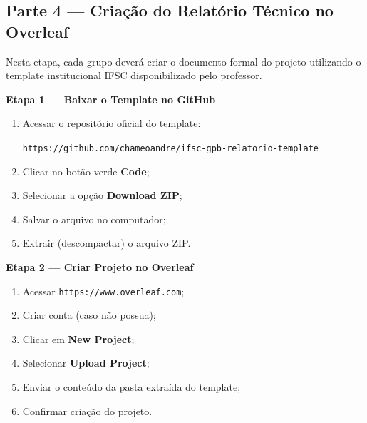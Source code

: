 
\subsection{Parte 4 — Criação do Relatório Técnico no Overleaf}

\begin{boxAtividade}

Nesta etapa, cada grupo deverá criar o documento formal do projeto utilizando o template institucional IFSC disponibilizado pelo professor.

\textbf{Etapa 1 — Baixar o Template no GitHub}

\begin{enumerate}
    \item Acessar o repositório oficial do template:
    
    \texttt{https://github.com/chameoandre/ifsc-gpb-relatorio-template}
    
    \item Clicar no botão verde \textbf{Code};
    \item Selecionar a opção \textbf{Download ZIP};
    \item Salvar o arquivo no computador;
    \item Extrair (descompactar) o arquivo ZIP.
\end{enumerate}

\vspace{0.4cm}

\textbf{Etapa 2 — Criar Projeto no Overleaf}

\begin{enumerate}
    \item Acessar \texttt{https://www.overleaf.com};
    \item Criar conta (caso não possua);
    \item Clicar em \textbf{New Project};
    \item Selecionar \textbf{Upload Project};
    \item Enviar o conteúdo da pasta extraída do template;
    \item Confirmar criação do projeto.
\end{enumerate}
\end{boxAtividade}

\vspace{0.4cm}


